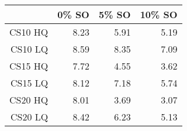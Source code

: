 \begin{table}[ht]
\begin{center}
\begin{tabular}{rrrr}
  \hline
 & 0\% SO & 5\% SO & 10\% SO \\
  \hline
CS10 HQ & 8.23 & 5.91 & 5.19 \\
  CS10 LQ & 8.59 & 8.35 & 7.09 \\
  CS15 HQ & 7.72 & 4.55 & 3.62 \\
  CS15 LQ & 8.12 & 7.18 & 5.74 \\
  CS20 HQ & 8.01 & 3.69 & 3.07 \\
  CS20 LQ & 8.42 & 6.23 & 5.13 \\
   \hline
\end{tabular}
\end{center}
\end{table}

